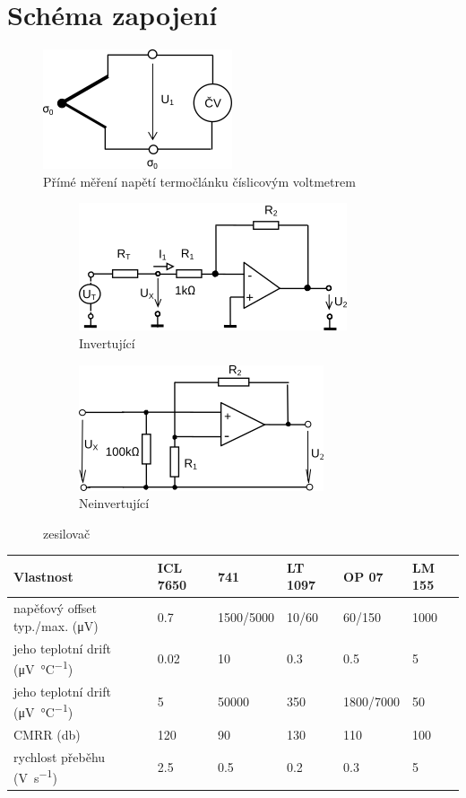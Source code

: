 \documentclass{article}
\begin{document}
\section{Schéma zapojení}
\begin{figure}[H]
	\centering
	\includegraphics{scheme1}
	\caption{Přímé měření napětí termočlánku číslicovým voltmetrem}
	\label{fig:scheme1}
\end{figure}
\begin{figure}[H]
	\centering
	\begin{subfigure}{0.5\textwidth}
		\includegraphics[scale=0.7]{scheme2}
		\caption{Invertující}
		\label{fig:scheme2}
	\end{subfigure}
	\begin{subfigure}{0.45\textwidth}
		\includegraphics[scale=0.7]{scheme3}
		\caption{Neinvertující}
		\label{fig:scheme3}
	\end{subfigure}
	\caption{zesilovač}
\end{figure}
\begin{table}[h]
	\begin{tabular}{|l||l|l|l|l|l|}
		\hline
		 \textbf{Vlastnost} & \textbf{ICL 7650} & \textbf{741}& \textbf{LT 1097} & \textbf{OP 07}     & \textbf{LM 155} \\ \hline \hline
		napěťový offset  typ./max. (\si{\micro\volt}) & 0.7      & 1500/5000 & 10/60   & 60/150    & 1000   \\ \hline
		jeho teplotní drift (\si{\micro\volt\per\degreeCelsius})     & 0.02     & 10        & 0.3     & 0.5       & 5      \\ \hline
		jeho teplotní drift (\si{\micro\volt\per\degreeCelsius})     & 5        & 50000     & 350     & 1800/7000 & 50     \\ \hline
		CMRR (\si{\decibel})                       & 120      & 90        & 130     & 110       & 100    \\ \hline
		rychlost přeběhu (\si{\volt\per\second})         & 2.5      & 0.5       & 0.2     & 0.3       & 5      \\ \hline
	\end{tabular}
\end{table}
\end{document}
